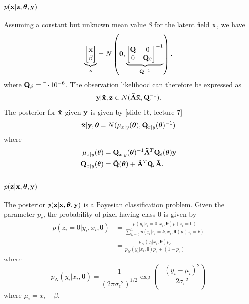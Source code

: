 \documentclass[a4paper,10pt]{article}
\def\bQ{{\bf Q}}
\def\btQ{{\bf \tilde Q}}
\def\btA{{\bf \tilde A}}
\def\bx{{\bf x}}
\def\by{{\bf y}}
\def\bz{{\bf z}}
\def\btx{{\bf{\tilde x}}}
\def\btheta{{\boldsymbol \theta}}
\def\sigmaeps{{\sigma_{\epsilon}}}
\begin{document}
\subsubsection{$p(\bx|\bz,\btheta,\by)$}
Assuming a constant but unknown mean value $\beta$ for the latent field $\bx$, we have
\begin{equation}
 \underbrace{\begin{bmatrix}
              \bx \\
              \beta
             \end{bmatrix}
}_{\btx} = N\left( \bf{0}, \underbrace{\begin{bmatrix}
                                  \bQ & 0 \\
                                  0 & \bQ_{\beta}
                                 \end{bmatrix}^{-1}}_{\btQ^{-1}} \right).
\end{equation}
where $\bQ_{\beta} =  \mathbb{I}\cdot 10^{-6}$. The observation likelihood can therefore be expressed as
\begin{equation}
 \by|\btx, \bz \in N(\btA\btx, \bQ_{\epsilon}^{-1}).
\end{equation}
The posterior for $\btx$ given $\by$ is given by [slide 16, lecture 7]
\begin{equation}
 \btx|\by, \btheta = N(\mu_{x|y} (\btheta), \bQ_{x|y}(\btheta)^{-1}) 
\end{equation}
where
\begin{align}
 \mu_{x|y} (\btheta) &=  \bQ_{x|y}(\btheta)^{-1} \btA^T \bQ_{\epsilon} (\btheta) \by \nonumber \\
 \bQ_{x|y}(\btheta) &= \btQ(\btheta) + \btA^T \bQ_{\epsilon}\btA.
\end{align}

\subsubsection{$p(\bz|\bx,\btheta,\by)$}
The posterior $p(\bz|\bx,\btheta,\by)$ is a Bayesian classification problem. Given the parameter $p_c$, the probability of pixel having class 0 is given by
\begin{align}
 p(z_i = 0| y_i, x_i, \btheta) &= \frac{p(y_i|z_i = 0, x_i, \btheta) p(z_i = 0)}{\sum_{k = 0}^1 p(y_i|z_i = k, x_i, \btheta) p(z_i = k)} \nonumber \\
 &= \frac{p_N(y_i|x_i,\btheta) p_c}{p_N(y_i|x_i,\btheta) p_c + (1-p_c)}
 \label{eq:bhmclass}
\end{align}
where
\begin{equation}
 p_N(y_i|x_i,\btheta) = \frac{1}{(2\pi \sigmaeps^2)^{1/2}} \exp\left( - \frac{(y_i - \mu_i)^2}{2\sigmaeps^2} \right)
\end{equation}
where $\mu_i = x_i + \beta$.
\end{document}
